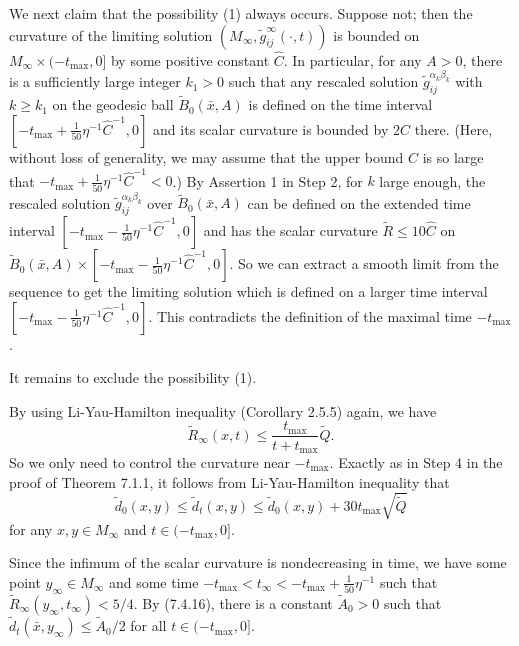 We next claim that the possibility (1) always occurs. Suppose not;
then the curvature of the limiting solution
$(M_{\infty},\widetilde{g}^{\infty}_{ij}(\cdot,t))$ is bounded on
$M_{\infty}\times(-t_{\max},0]$ by some positive constant
$\hat{C}$. In particular, for any $A>0$, there is a sufficiently
large integer $k_1>0$ such that any rescaled solution
$\widetilde{g}^{\alpha_k\beta_k}_{ij}$ with $k\geq k_1$ on the
geodesic ball $\widetilde{B}_{0}(\bar{x},A)$ is defined on the
time interval $[-t_{\max}+\frac{1}{50}\eta^{-1}{\hat{C}}^{-1},0]$
and its scalar curvature is bounded by $2\hat{C}$ there. (Here,
without loss of generality, we may assume that the upper bound
$\hat{C}$ is so large that
$-t_{\max}+\frac{1}{50}\eta^{-1}{\hat{C}}^{-1} < 0$.) By Assertion
1 in Step 2, for $k$ large enough, the rescaled solution
$\widetilde{g}^{\alpha_k \beta_k}_{ij}$ over
$\widetilde{B}_{0}(\bar{x},A)$ can be defined on the extended time
interval $[-t_{\max}-\frac{1}{50}\eta^{-1}{\hat{C}}^{-1},0]$ and
has the scalar curvature $\widetilde{R}\leq 10 \hat{C}$ on
$\widetilde{B}_{0}(\bar{x},A)\times
[-t_{\max}-\frac{1}{50}\eta^{-1}{\hat{C}}^{-1},0]$. So we can
extract a smooth limit from the sequence to get the limiting
solution which is defined on a larger time interval
$[-t_{\max}-\frac{1}{50}\eta^{-1}{\hat{C}}^{-1},0]$. This
contradicts the definition of the maximal time $-t_{\max}$.

It remains to exclude the possibility (1).

By using Li-Yau-Hamilton inequality (Corollary 2.5.5) again, we
have
$$
\widetilde{R}_{\infty}(x,t)\leq
\frac{t_{\max}}{t+t_{\max}}\widetilde{Q}.
$$
So we only need to control the curvature near $-t_{\max}$. Exactly
as in Step 4 in the proof of Theorem 7.1.1, it follows from
Li-Yau-Hamilton inequality that \begin{equation} \tilde{d}_0(x,y)\leq
\tilde{d}_t(x,y)\leq \tilde{d}_0(x,y)
+30t_{\max}\sqrt{\widetilde{Q}}
\end{equation} for any $x,y\in M_{\infty}$ and $t\in(-t_{\max},0]$.

Since the infimum of the scalar curvature is nondecreasing in
time, we have some point $y_{\infty}\in M_{\infty}$  and some time
$-t_{\max} < t_{\infty} < -t_{\max}+\frac{1}{50}\eta^{-1}$ such
that $\widetilde{R}_{\infty}(y_{\infty},t_{\infty})<{5}/{4}$. By
(7.4.16), there is a constant $\widetilde{A}_0>0$ such that
$\tilde{d}_t(\bar{x},y_{\infty})\leq \widetilde{A}_0/2$ for all $t
\in (-t_{\max},0]$.

